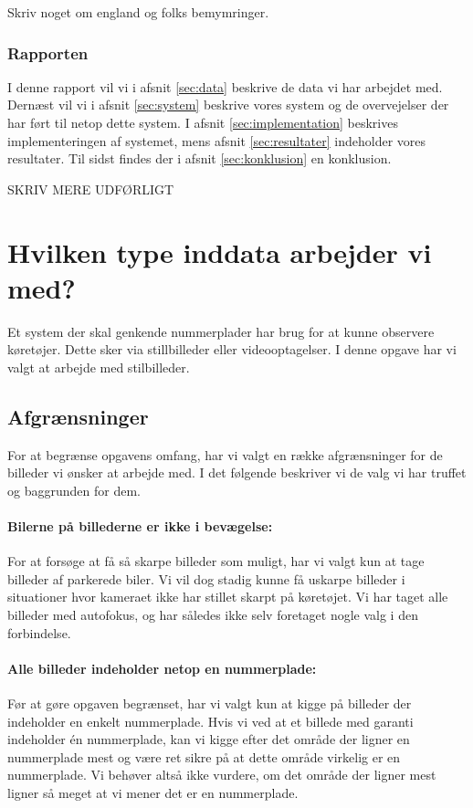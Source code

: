 Skriv noget om england og folks bemymringer.

\subsubsection*{Rapporten}
I denne rapport vil vi i afsnit \vref{sec:data} beskrive de data vi har arbejdet med. Dernæst vil vi i afsnit \vref{sec:system} beskrive vores system og de overvejelser der har ført til netop dette system. I afsnit \vref{sec:implementation} beskrives implementeringen af systemet, mens afsnit \vref{sec:resultater} indeholder vores resultater. Til sidst findes der i afsnit \vref{sec:konklusion} en konklusion.

SKRIV MERE UDFØRLIGT

\section{Hvilken type inddata arbejder vi med?}
\label{sec:data}
Et system der skal genkende nummerplader har brug for at kunne observere køretøjer. Dette sker via stillbilleder eller videooptagelser. I denne opgave har vi valgt at arbejde med stilbilleder.

\subsection{Afgrænsninger}
For at begrænse opgavens omfang, har vi valgt en række afgrænsninger for de billeder vi ønsker at arbejde med. I det følgende beskriver vi de valg vi har truffet og baggrunden for dem.

\paragraph{Bilerne på billederne er ikke i bevægelse:}
For at forsøge at få så skarpe billeder som muligt, har vi valgt kun at tage billeder af parkerede biler. Vi vil dog stadig kunne få uskarpe billeder i situationer hvor kameraet ikke har stillet skarpt på køretøjet. Vi har taget alle billeder med autofokus, og har således ikke selv foretaget nogle valg i den forbindelse.

\paragraph{Alle billeder indeholder netop en nummerplade:}
Før at gøre opgaven begrænset, har vi valgt kun at kigge på billeder der indeholder en enkelt nummerplade. Hvis vi ved at et billede med garanti indeholder én nummerplade, kan vi kigge efter det område der ligner en nummerplade mest og være ret sikre på at dette område virkelig er en nummerplade. Vi behøver altså ikke vurdere, om det område der ligner mest ligner så meget at vi mener det er en nummerplade.

